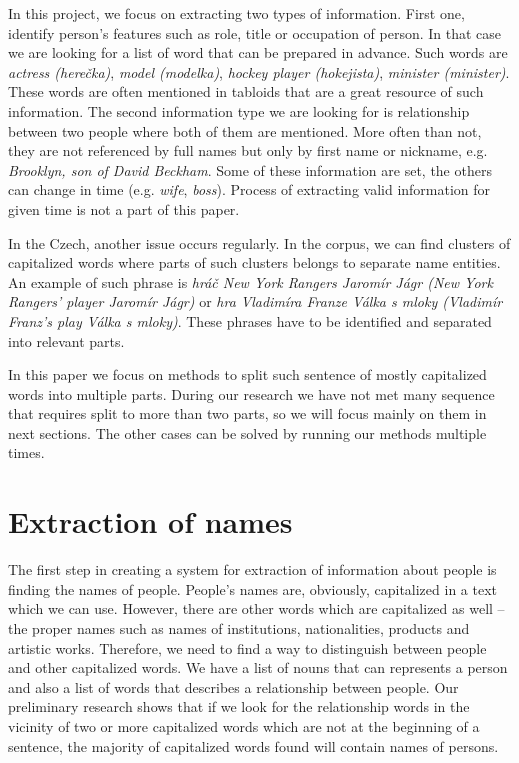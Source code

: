 \documentclass[runningheads]{llncs}
\begin{document}
In this project, we focus on extracting two types of information. First one,
identify person's features such as role, title or occupation of person.  In
that case we are looking for a list of word that can be prepared in advance. 
Such words are {\em actress (herečka)}, {\em model (modelka)}, {\em hockey player
(hokejista)}, {\em minister (minister)}.  These words are often mentioned in
tabloids that are a great resource of such information.  The second
information type we are looking for is relationship between two people where
both of them are mentioned.  More often than not, they are not referenced by
full names but only by first name or nickname, e.g.  {\em Brooklyn, son of David
Beckham}.  Some of these information are set, the others can change in time
(e.g.  {\em wife}, {\em boss}).  Process of extracting valid information for given
time is not a part of this paper.

In the Czech, another issue occurs regularly. In the corpus, we can find
clusters of capitalized words where parts of such clusters belongs to
separate name entities.  An example of such phrase is {\em hr\'{a}\v{c} New
York Rangers Jaromír J\'{a}gr (New York Rangers' player Jaromír Jágr)} or
{\em hra Vladim\'{i}ra Franze V\'{a}lka s mloky (Vladim\'{i}r Franz's play
V\'{a}lka s mloky)}.  These phrases have to be identified and separated into
relevant parts.

In this paper we focus on methods to split such sentence of mostly
capitalized words into multiple parts. During our research we have not met
many sequence that requires split to more than two parts, so we will focus
mainly on them in next sections. The other cases can be solved by running
our methods multiple times.

\section{Extraction of names}

The first step in creating a system for extraction of information about
people is finding the names of people.  People’s names are, obviously,
capitalized in a text which we can use.  However, there are other words
which are capitalized as well – the proper names such as names of
institutions, nationalities, products and artistic works.  Therefore, we
need to find a way to distinguish between people and other capitalized
words.  We have a list of nouns that can represents a person
\cite{grac2013rapid} and also a list of words that describes a relationship
between people.  Our preliminary research shows that if we look for the
relationship words in the vicinity of two or more capitalized words which
are not at the beginning of a sentence, the majority of capitalized words
found will contain names of persons.
\end{document}
